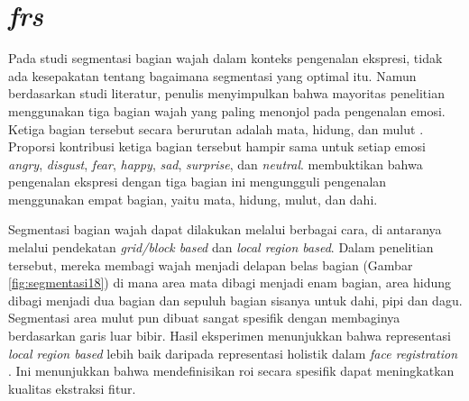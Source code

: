 \section{\textit{\acrlong{frs}}}
Pada studi segmentasi bagian wajah dalam konteks pengenalan ekspresi, tidak ada kesepakatan tentang bagaimana segmentasi yang optimal itu. Namun berdasarkan studi literatur, penulis menyimpulkan bahwa mayoritas penelitian menggunakan tiga bagian wajah yang paling menonjol pada pengenalan emosi. Ketiga bagian tersebut secara berurutan adalah mata, hidung, dan mulut . Proporsi kontribusi ketiga bagian tersebut hampir sama untuk setiap emosi \textit{angry}, \textit{disgust}, \textit{fear}, \textit{happy}, \textit{sad}, \textit{surprise}, dan \textit{neutral}.  membuktikan bahwa pengenalan ekspresi dengan tiga bagian ini mengungguli pengenalan menggunakan empat bagian, yaitu mata, hidung, mulut, dan dahi.

Segmentasi bagian wajah dapat dilakukan melalui berbagai cara, di antaranya melalui pendekatan \textit{grid/block based} dan \textit{local region based}. Dalam penelitian tersebut, mereka membagi wajah menjadi delapan belas bagian (Gambar \ref{fig:segmentasi18}) di mana area mata dibagi menjadi enam bagian, area hidung dibagi menjadi dua bagian dan sepuluh bagian sisanya untuk dahi, pipi dan dagu. Segmentasi area mulut pun dibuat sangat spesifik dengan membaginya berdasarkan garis luar bibir. Hasil eksperimen menunjukkan bahwa representasi \textit{local region based} lebih baik daripada representasi holistik dalam \textit{face registration} . Ini menunjukkan bahwa mendefinisikan \acrshort{roi} secara spesifik dapat meningkatkan kualitas ekstraksi fitur.

